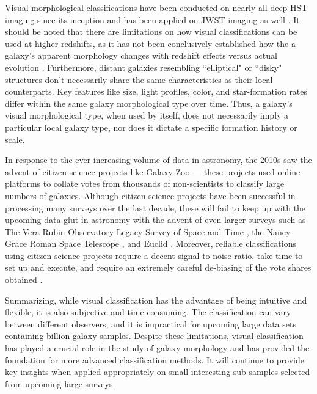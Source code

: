 Visual morphological classifications have been conducted on nearly all deep HST imaging since its inception \citep[e.g.,][]{vdb_96, lee_13, kartaltepe_15} and has been applied on JWST imaging as well \citep[e.g.,][]{kartaltepe_23}. It should be noted that there are limitations on how visual classifications can be used at higher redshifts, as it has not been conclusively established how the a galaxy's apparent morphology changes with redshift effects versus actual evolution \citep[e.g.,][]{morph_review}. Furthermore, distant galaxies resembling ``elliptical" or ``disky" structures don't necessarily share the same characteristics as their local counterparts. Key features like size, light profiles, color, and star-formation rates differ within the same galaxy morphological type over time. Thus, a galaxy's visual morphological type, when used by itself, does not necessarily imply a particular local galaxy type, nor does it dictate a specific formation history or scale.

In response to the ever-increasing volume of data in astronomy, the 2010s saw the advent of citizen science projects like Galaxy Zoo \citep{gzoo_original} --- these projects used online platforms to collate votes from thousands of non-scientists to classify large numbers of galaxies. Although citizen science projects have been successful in processing many surveys over the last decade, these will fail to keep up with the upcoming data glut in astronomy with the advent of even larger surveys such as The Vera Rubin Observatory Legacy Survey of Space and Time \citep[LSST;][]{lsst}, the Nancy Grace Roman Space Telescope \citep[NGRST;][]{ngrst}, and Euclid \citep{euclid}. Moreover, reliable  classifications using citizen-science projects require a decent signal-to-noise ratio, take time to set up and execute, and require an extremely careful de-biasing of the vote shares obtained \citep[e.g.,][]{gzoo_original,gzoo_candels}. 

Summarizing, while visual classification has the advantage of being intuitive and flexible, it is also subjective and time-consuming. The classification can vary between different observers, and it is impractical for upcoming large data sets containing billion galaxy samples. Despite these limitations, visual classification has played a crucial role in the study of galaxy morphology and has provided the foundation for more advanced classification methods. It will continue to provide key insights when applied appropriately on small interesting sub-samples selected from upcoming large surveys. 

